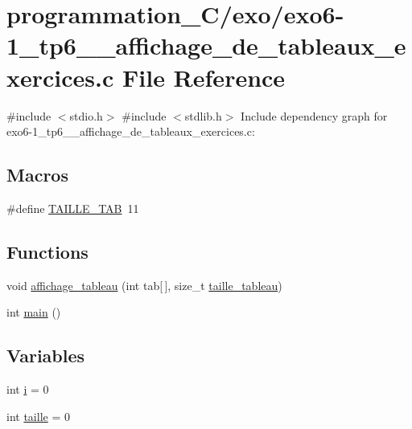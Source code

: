 \hypertarget{exo6-1__tp6__1__affichage__de__tableaux__exercices_8c}{}\section{programmation\+\_\+\+C/exo/exo6-\/1\+\_\+tp6\+\_\+\_\+affichage\+\_\+de\+\_\+tableaux\+\_\+exercices.c File Reference}
\label{exo6-1__tp6__1__affichage__de__tableaux__exercices_8c}
{\ttfamily \#include $<$stdio.\+h$>$}\newline
{\ttfamily \#include $<$stdlib.\+h$>$}\newline
Include dependency graph for exo6-\/1\+\_\+tp6\+\_\+\_\+affichage\+\_\+de\+\_\+tableaux\+\_\+exercices.c\+:
\subsection*{Macros}
\begin{DoxyCompactItemize}
\item 
\#define \hyperlink{exo6-1__tp6__1__affichage__de__tableaux__exercices_8c_a8e3cb9009b46b64393c55392ab1f685c}{T\+A\+I\+L\+L\+E\+\_\+\+T\+AB}~11
\end{DoxyCompactItemize}
\subsection*{Functions}
\begin{DoxyCompactItemize}
\item 
void \hyperlink{exo6-1__tp6__1__affichage__de__tableaux__exercices_8c_a4e03196b1767924522b362cf9eea5e13}{affichage\+\_\+tableau} (int tab\mbox{[}$\,$\mbox{]}, size\+\_\+t \hyperlink{fonction__affichage_8c_a09748fb1f2fd38d0fd97b52bc8fb1684}{taille\+\_\+tableau})
\item 
int \hyperlink{exo6-1__tp6__1__affichage__de__tableaux__exercices_8c_ae66f6b31b5ad750f1fe042a706a4e3d4}{main} ()
\end{DoxyCompactItemize}
\subsection*{Variables}
\begin{DoxyCompactItemize}
\item 
int \hyperlink{exo6-1__tp6__1__affichage__de__tableaux__exercices_8c_acb559820d9ca11295b4500f179ef6392}{i} = 0
\item 
int \hyperlink{exo6-1__tp6__1__affichage__de__tableaux__exercices_8c_a29bf3fc0ffe4e72e45f0c84ab4f8cd1e}{taille} = 0
\end{DoxyCompactItemize}


